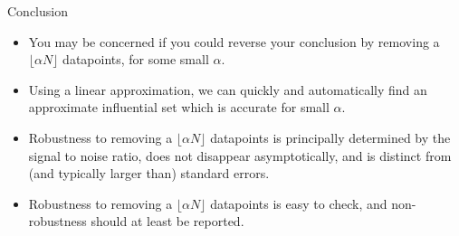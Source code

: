 \begin{frame}{Conclusion}

\begin{itemize}
\item You may be concerned if you could reverse your conclusion by removing
a $\lfloor \alpha N \rfloor$ datapoints, for some small $\alpha$.

\pause
\item Using a linear approximation, we can quickly and automatically find an
approximate influential set which is accurate for small $\alpha$.

\pause
\item Robustness to removing a $\lfloor \alpha N \rfloor$ datapoints is
principally determined by the signal to noise ratio, does not disappear
asymptotically, and is distinct from (and typically larger than) standard
errors.

\pause
\item Robustness to removing a $\lfloor \alpha N \rfloor$ datapoints is
easy to check, and non-robustness should at least be reported.

\end{itemize}

\end{frame}


